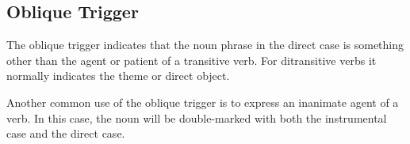 \documentclass[grammar]{subfiles}
\begin{document}
\subsection{Oblique Trigger}
\label{ssec:vp_obl_trigger}

The oblique trigger indicates that the noun phrase in the direct case is
something other than the agent or patient of a transitive verb.  For
ditransitive verbs it normally indicates the theme or direct object.

Another common use of the oblique trigger is to express an inanimate agent of a
verb. In this case, the noun will be double-marked with both the instrumental
case and the direct case. 
\end{document}
